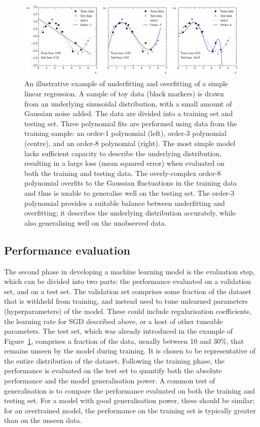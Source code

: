\begin{figure}[htbp!]
\centering
\includegraphics[width =1.0\linewidth]{Figures/ML/overfitting_example.pdf}\hfill%
\caption[An example of underfitting and overfitting to training data with a linear regression.]{An illustrative example of underfitting and overfitting of a simple linear regression. A sample of toy data (black markers) is drawn from an underlying sinusoidal distribution, with a small amount of Gaussian noise added. The data are divided into a training set and testing set. Three polynomial fits are performed using data from the training sample: an order-1 polynomial (left), order-3 polynomial (centre), and an order-8 polynomial (right). The most simple model lacks sufficient capacity to describe the underlying distribution, resulting in a large loss (mean squared error) when evaluated on both the training and testing data. The overly-complex order-8 polynomial overfits to the Gaussian fluctuations in the training data and thus is unable to generalise well on the testing set. The order-3 polynomial provides a suitable balance between underfitting and overfitting; it describes the underlying distribution accurately, while also generalising well on the unobserved data.}
\label{fig:ML_overfitting}
\end{figure}

\subsection{Performance evaluation}

The second phase in developing a machine learning model is the evaluation step, which can be divided into two parts: the performance evaluated on a validation set, and on a test set. The validation set comprises some fraction of the dataset that is withheld from training, and instead used to tune unlearned parameters (hyperparameters) of the model. These could include regularisation coefficients, the learning rate for SGD described above, or a host of other tuneable parameters. The test set, which was already introduced in the example of Figure~\ref{fig:ML_overfitting}, comprises a fraction of the data, usually between 10 and 30\%, that remains unseen by the model during training. It is chosen to be representative of the entire distribution of the dataset. Following the training phase, the performance is evaluated on the test set to quantify both the absolute performance and the model generalisation power. A common test of generalisation is to compare the performance evaluated on both the training and testing set. For a model with good generalisation power, these should be similar; for an overtrained model, the performance on the training set is typically greater than on the unseen data.

